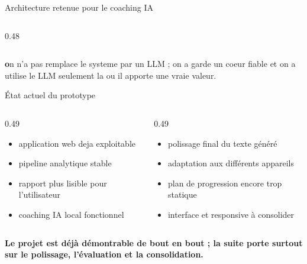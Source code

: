 ﻿\documentclass[10pt,aspectratio=169]{beamer}
\begin{document}
\begin{frame}{Architecture retenue pour le coaching IA}
\begin{columns}[T]
\begin{column}{0.48\textwidth}
\end{column}
\end{columns}
\vspace{0.3cm}
\begin{tcolorbox}[colback=primary!4,colframe=primary!25]
\small \textbf on n'a pas remplace le systeme par un LLM ; on a garde un coeur fiable et on a utilise le LLM seulement la ou il apporte une vraie valeur.
\end{tcolorbox}
\end{frame}

\begin{frame}{État actuel du prototype}
\begin{columns}[T]
\begin{column}{0.49\textwidth}
\begin{tcolorbox}[title=Points solides, colframe=success, colback=success!4]
\small
\begin{itemize}
    \item application web deja exploitable
    \item pipeline analytique stable
    \item rapport plus lisible pour l'utilisateur
    \item coaching IA local fonctionnel
\end{itemize}
\end{tcolorbox}
\end{column}
\begin{column}{0.49\textwidth}
\begin{tcolorbox}[title=Points à finaliser, colframe=warning!60!black, colback=warning!8]
\small
\begin{itemize}
    \item polissage final du texte généré
    \item adaptation aux différents appareils
    \item plan de progression encore trop statique
    \item interface et responsive à consolider
\end{itemize}
\end{tcolorbox}
\end{column}
\end{columns}
\vspace{0.35cm}
\begin{keybox}
\textbf{Le projet est déjà démontrable de bout en bout ; la suite porte surtout sur le polissage, l'évaluation et la consolidation.}
\end{keybox}
\end{frame}
\end{document}

